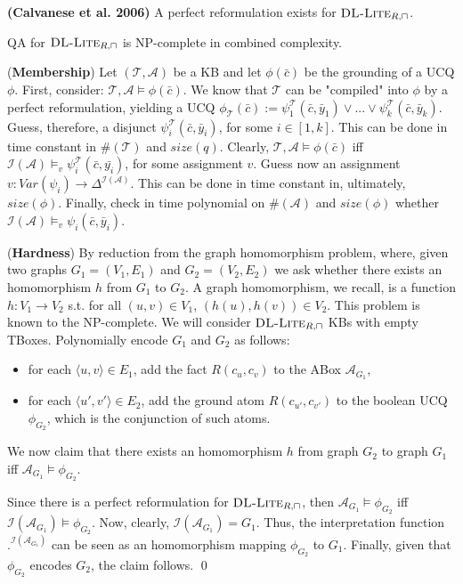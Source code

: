 \documentclass[11pt]{llncs}
\newcommand{\e}[1]{{\bf #1}}
\newcommand{\logic}[1]{\textsc{#1}\xspace}
\newcommand{\Var}[1]{\textit{Var}(#1)}
\newcommand{\g}[1]{\logic{#1}}
\newcommand{\tup}[1]{(#1)}
\newcommand{\card}[1]{\#(#1)}
\newcommand{\f}[1]{\mathcal{#1}}
\newcommand{\NP}{\textsc{NP}\xspace}
\newcommand{\dlliterc}{\g{DL-Lite}_{R,\sqcap}\xspace}
\renewcommand{\vec}[1]{\bar{#1}} \pagestyle{empty}
\begin{document}
\begin{proposition}
{\bf (Calvanese et al. 2006)}
A perfect reformulation exists for $\dlliterc$.
\end{proposition}

\begin{theorem}
QA for $\dlliterc$ is \NP-complete in combined complexity.
\end{theorem}

\proof 
(\e{Membership}) Let $\tup{\f{T},\f{A}}$ be a
KB and let $\phi(\vec{c})$ be the grounding of a UCQ $\phi$.
First, consider:
$\f{T} , \f{A} \models \phi(\vec{c}).$
We know that
$\f{T}$ can be "compiled" into $\phi$ by a perfect reformulation, yielding a
UCQ
$\phi_{\f{T}}(\vec{c}) :=
\psi^{\f{T}}_1(\vec{c},\vec{y}_1) \lor ... \lor
\psi^{\f{T}}_k(\vec{c},\vec{y}_k)$. Guess, therefore, a disjunct
$\psi^{\f{T}}_i(\vec{c},\vec{y}_i)$, for some $i \in [1,k]$.
This can be done in time constant in $\card{\f{T}}$ and $\textit{size}(q)$.
Clearly, $\f{T} , \f{A} \models \phi(\vec{c})$ iff
$\f{I}(\f{A}) \models_v \psi^{\f{T}}_i(\vec{c},\vec{y_i})$, for
some assignment $v$. 
Guess now an assignment $v \colon \Var{\psi_i} \to 
\Delta^{\f{I}(\f{A})}$. 
This can be done in time constant in, ultimately, $\textit{size}(\phi)$.
Finally, check in
time polynomial on $\card{\f{A}}$ and $\textit{size}(\phi)$ whether
$\f{I}(\f{A})\models_{v} \psi_i(\vec{c},\vec{y}_i)$.

(\e{Hardness}) By reduction from the graph homomorphism problem, where, given
two graphs $G_1 = \tup{V_1, E_1}$ and $G_2 = \tup{V_2, E_2}$
we ask whether there exists an homomorphism $h$ from $G_1$ to $G_2$. 
A graph homomorphism, we recall, is a function $h \colon V_1 \to V_2$ s.t.
for all $\tup{u,v} \in V_1$, $\tup{h(u),h(v)} \in V_2$.
This problem is known to the \NP-complete.
We will consider $\dlliterc$ KBs with empty TBoxes.
Polynomially encode $G_1$ and $G_2$ as follows:
\begin{itemize}
\item for each $\langle u, v \rangle \in E_1$, add the fact $R(c_u,c_v)$
to the ABox $\f{A}_{G_1}$,
\item for each $\langle u', v' \rangle \in E_2$, add the ground atom $R(c_{u'},c_{v'})$
to the boolean UCQ $\phi_{G_2}$, which is the conjunction of such atoms.
\end{itemize}

We now claim that
there exists an homomorphism $h$ from graph $G_2$ to graph $G_1$
iff $\f{A}_{G_1} \models \phi_{G_2}$.

Since there is a perfect reformulation for $\dlliterc$, then
$\f{A}_{G_1} \models \phi_{G_2}$ iff $\f{I}(\f{A}_{G_1}) \models \phi_{G_2}$.
Now, clearly, $\f{I}(\f{A}_{G_1}) = G_1$.
Thus, the interpretation function $.^{\f{I}(\f{A}_{G_1})}$ can be seen as an homomorphism mapping
$\phi_{G_2}$ to $G_1$. Finally, given that $\phi_{G_2}$ encodes $G_2$, the claim
follows. \qed
\end{document}
